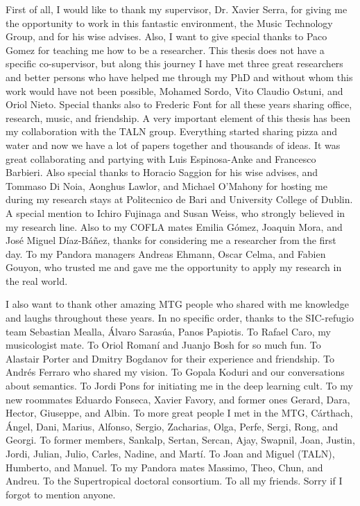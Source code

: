 First of all, I would like to thank my supervisor, Dr. Xavier Serra, for giving me the opportunity to work in this fantastic environment, the Music Technology Group, and for his wise advises. Also, I want to give special thanks to Paco Gomez for teaching me how to be a researcher. This thesis does not have a specific co-supervisor, but along this journey I have met three great researchers and better persons who have helped me through my PhD and without whom this work would have not been possible, Mohamed Sordo, Vito Claudio Ostuni, and Oriol Nieto. 
Special thanks also to Frederic Font for all these years sharing office, research, music, and friendship.
A very important element of this thesis has been my collaboration with the TALN group. Everything started sharing pizza and water and now we have a lot of papers together and thousands of ideas. It was great collaborating and partying with Luis Espinosa-Anke and Francesco Barbieri. Also special thanks to Horacio Saggion for his wise advises, and Tommaso Di Noia, Aonghus Lawlor, and Michael O'Mahony for hosting me during my research stays at Politecnico de Bari and University College of Dublin.
A special mention to Ichiro Fujinaga and Susan Weiss, who strongly believed in my research line. Also to my COFLA mates Emilia Gómez, Joaquin Mora, and José Miguel Díaz-Báñez, thanks for considering me a researcher from the first day.
To my Pandora managers Andreas Ehmann, Oscar Celma, and Fabien Gouyon, who trusted me and gave me the opportunity to apply my research in the real world.

I also want to thank other amazing MTG people who shared with me knowledge and laughs throughout these years. In no specific order, thanks to the SIC-refugio team
Sebastian Mealla, Álvaro Sarasúa, Panos Papiotis. To Rafael Caro, my musicologist mate. To Oriol Romaní and Juanjo Bosh for so much fun. To Alastair Porter and Dmitry Bogdanov for their experience and friendship. To Andrés Ferraro who shared my vision. To Gopala Koduri and our conversations about semantics. To Jordi Pons for initiating me in the deep learning cult. To my new roommates Eduardo Fonseca, Xavier Favory, and former ones Gerard, Dara, Hector, Giuseppe, and Albin. To more great people I met in the MTG, Cárthach, Ángel, Dani, Marius, Alfonso, Sergio, Zacharias, Olga, Perfe, Sergi, Rong, and Georgi. To former members, Sankalp, Sertan, Sercan, Ajay, Swapnil, Joan, Justin, Jordi, Julian, Julio, Carles, Nadine, and Martí. To Joan and Miguel (TALN), Humberto, and Manuel. To my Pandora mates Massimo, Theo, Chun, and Andreu. To the Supertropical doctoral consortium. To all my friends. Sorry if I forgot to mention anyone.

